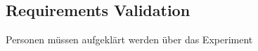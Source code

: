 \subsection{Requirements Validation}


Personen müssen aufgeklärt werden über das Experiment \cite{Dresch.2011}








